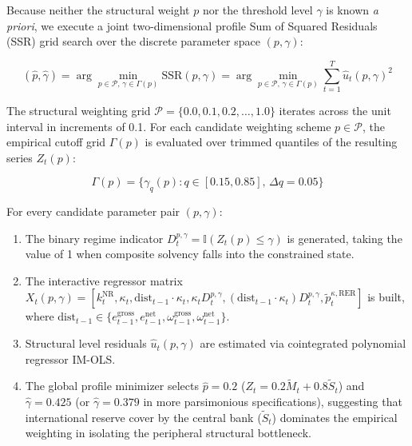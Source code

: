 Because neither the structural weight $p$ nor the threshold level $\gamma$ is known \textit{a priori}, we execute a joint two-dimensional profile Sum of Squared Residuals (SSR) grid search over the discrete parameter space $(p, \gamma)$:

\begin{equation}
	(\hat{p}, \hat{\gamma}) = \arg\min_{p \in \mathcal{P}, \, \gamma \in \Gamma(p)} \text{SSR}(p, \gamma) = \arg\min_{p \in \mathcal{P}, \, \gamma \in \Gamma(p)} \sum_{t=1}^{T} \hat{u}_t(p, \gamma)^2
\end{equation}

The structural weighting grid $\mathcal{P} = \{ 0.0, 0.1, 0.2, \dots, 1.0 \}$ iterates across the unit interval in increments of 0.1. For each candidate weighting scheme $p \in \mathcal{P}$, the empirical cutoff grid $\Gamma(p)$ is evaluated over trimmed quantiles of the resulting series $Z_t(p)$:

\begin{equation}
	\Gamma(p) = \{ \gamma_q(p) : q \in [0.15, 0.85], \, \Delta q = 0.05 \}
\end{equation}

For every candidate parameter pair $(p, \gamma)$:
\begin{enumerate}
	\item The binary regime indicator $D_t^{p, \gamma} = \mathbb{I}(Z_t(p) \le \gamma)$ is generated, taking the value of 1 when composite solvency falls into the constrained state.
	\item The interactive regressor matrix $X_t(p, \gamma) = [k_t^{\text{NR}}, \kappa_t, \text{dist}_{t-1} \cdot \kappa_t, \kappa_t D_t^{p, \gamma}, (\text{dist}_{t-1} \cdot \kappa_t) D_t^{p, \gamma}, \tilde{p}_t^{\kappa, \text{RER}}]$ is built, where $\text{dist}_{t-1} \in \{ e_{t-1}^{\text{gross}}, e_{t-1}^{\text{net}}, \omega_{t-1}^{\text{gross}}, \omega_{t-1}^{\text{net}} \}$.
	\item Structural level residuals $\hat{u}_t(p, \gamma)$ are estimated via cointegrated polynomial regressor IM-OLS.
	\item The global profile minimizer selects $\hat{p} = 0.2$ ($Z_t = 0.2 \tilde{M}_t + 0.8 \tilde{S}_t$) and $\hat{\gamma} = 0.425$ (or $\hat{\gamma} = 0.379$ in more parsimonious specifications), suggesting that international reserve cover by the central bank ($\tilde{S}_t$) dominates the empirical weighting in isolating the peripheral structural bottleneck.
\end{enumerate}


